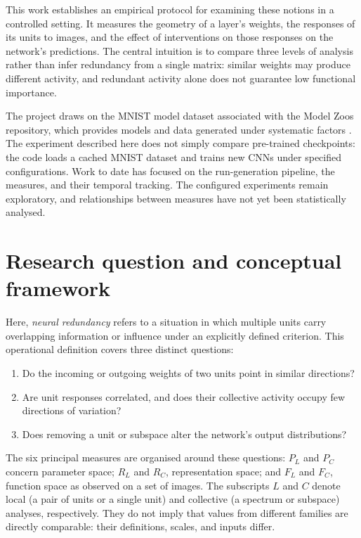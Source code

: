 \documentclass[11pt,a4paper]{article}
\begin{document}
This work establishes an empirical protocol for examining these notions in a controlled setting. It measures the geometry of a layer's weights, the responses of its units to images, and the effect of interventions on those responses on the network's predictions. The central intuition is to compare three levels of analysis rather than infer redundancy from a single matrix: similar weights may produce different activity, and redundant activity alone does not guarantee low functional importance.

The project draws on the MNIST model dataset associated with the Model Zoos repository, which provides models and data generated under systematic factors \citep{schurholt2022modelzoos}. The experiment described here does not simply compare pre-trained checkpoints: the code loads a cached MNIST dataset and trains new CNNs under specified configurations. Work to date has focused on the run-generation pipeline, the measures, and their temporal tracking. The configured experiments remain exploratory, and relationships between measures have not yet been statistically analysed.

\section{Research question and conceptual framework}

Here, \emph{neural redundancy} refers to a situation in which multiple units carry overlapping information or influence under an explicitly defined criterion. This operational definition covers three distinct questions:
\begin{enumerate}
    \item Do the incoming or outgoing weights of two units point in similar directions?
    \item Are unit responses correlated, and does their collective activity occupy few directions of variation?
    \item Does removing a unit or subspace alter the network's output distributions?
\end{enumerate}

The six principal measures are organised around these questions: $P_L$ and $P_C$ concern parameter space; $R_L$ and $R_C$, representation space; and $F_L$ and $F_C$, function space as observed on a set of images. The subscripts $L$ and $C$ denote local (a pair of units or a single unit) and collective (a spectrum or subspace) analyses, respectively. They do not imply that values from different families are directly comparable: their definitions, scales, and inputs differ.
\end{document}
